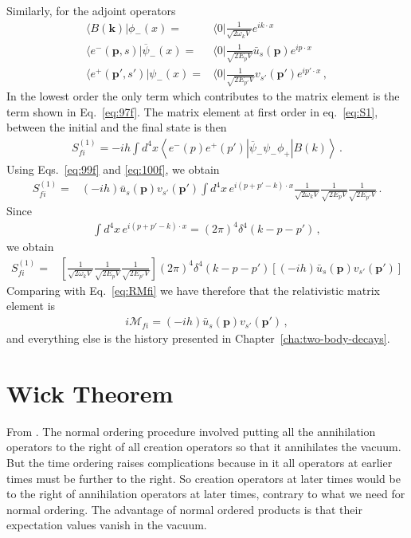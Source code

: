 Similarly, for the adjoint operators
\begin{align}
  \label{eq:100f}
   \langle B(\mathbf{k})|\phi_-(x)=&\langle0|\frac{1}{\sqrt{2 \omega_k V}}e^{i k\cdot x}\nonumber\\
  \langle e^-(\mathbf{p},s)|\overline{\psi}_-(x)=&\langle0|\frac{1}{\sqrt{2 E_p V}}\bar{u}_s(\mathbf{p})e^{i p\cdot x}\nonumber\\
  \langle e^+(\mathbf{p}',s')|\psi_-(x)=&\langle0|\frac{1}{\sqrt{2 E_{p'} V}}v_{s'}(\mathbf{p}')e^{i p'\cdot x}\,,
\end{align}
In the lowest order the only term which contributes to the matrix element is the term shown in Eq.~\eqref{eq:97f}.
The matrix element at first order in eq.~\eqref{eq:S1}, between the initial and the final state is then
\begin{align}
  S_{fi}^{(1)}=-i h \int d^4x\left\langle e^-(p)e^+(p')\left|\overline{\psi}_-\psi_-\phi_+\right|B(k)\right\rangle\,.
\end{align}
Using Eqs.~\eqref{eq:99f} and \eqref{eq:100f}, we obtain
\begin{align}
  S_{fi}^{(1)}=&(-i h)\bar{u}_s(\mathbf{p}) v_{s'}(\mathbf{p}')
\int d^4x\,e^{i(p+p'-k)\cdot x}\frac{1}{\sqrt{2\omega_k V}}\frac{1}{\sqrt{2E_p V}}\frac{1}{\sqrt{2E_{p'} V}}\,.
\end{align}
Since
\begin{align}
  \int d^4x\,e^{i(p+p'-k)\cdot x}=(2\pi)^4\delta^4(k-p-p')\,,
\end{align}
we obtain
\begin{align}
  S_{fi}^{(1)}=&\left[\frac{1}{\sqrt{2\omega_k V}}\frac{1}{\sqrt{2E_p V}}\frac{1}{\sqrt{2E_{p'} V}}\right]
(2\pi)^4\delta^4(k-p-p')\left[(-i h)\bar{u}_s(\mathbf{p}) v_{s'}(\mathbf{p}')\right]
\end{align}
Comparing with Eq.~\eqref{eq:RMfi} we have therefore that the relativistic matrix element is
\begin{align}
  i\mathcal{M}_{fi}=(-i h)\bar{u}_s(\mathbf{p}) v_{s'}(\mathbf{p}')\,,
\end{align}
and everything else is the history presented in Chapter~\ref{cha:two-body-decays}. 

\section{Wick Theorem}
\label{sec:wick-theorem}
From \cite{Lahiri:2005sm}. The normal ordering procedure involved putting all the annihilation operators to the right of all creation operators so that it annihilates the vacuum. But the time ordering raises complications because in it all operators at earlier times must be further to the right. So creation operators at later times would be to the right of annihilation operators at later times, contrary to what we need for normal ordering. The advantage of normal ordered products is that their expectation values vanish in the vacuum. 

